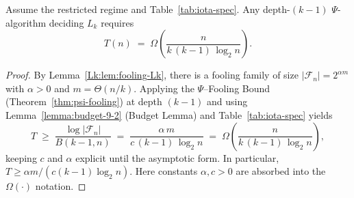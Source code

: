 \begin{theorem}[LB at depth $k{-}1$]\label{Lk:lb-main}
Assume the restricted regime and Table~\ref{tab:iota-spec}. Any depth-$(k{-}1)$ $\Psi$-algorithm deciding $L_k$ requires
\[
 T(n) \;=\; \Omega\!\left(\frac{n}{k\,(k{-}1)\,\log_{2} n}\right).
\]
\end{theorem}

\begin{proof}
By Lemma~\ref{Lk:lem:fooling-Lk}, there is a fooling family of size $|\mathcal{F}_n| = 2^{\alpha m}$ with $\alpha>0$ and $m=\Theta(n/k)$. Applying the $\Psi$--Fooling Bound (Theorem~\ref{thm:psi-fooling}) at depth $(k-1)$ and using Lemma~\ref{lemma:budget-9-2} (Budget Lemma) and Table~\ref{tab:iota-spec} yields
\[
 T \;\ge\; \frac{\log|\mathcal{F}_n|}{B(k-1,n)} \;=\; \frac{\alpha\,m}{c\,(k-1)\,\log_{2} n} \;=\; \Omega\!\left(\frac{n}{k\,(k-1)\,\log_{2} n}\right),
\]
 keeping $c$ and $\alpha$ explicit until the asymptotic form. In particular, $T \ge \alpha m / ( c (k-1) \log_{2} n )$. Here constants $\alpha,c>0$ are absorbed into the $\Omega(\cdot)$ notation.
\end{proof}


